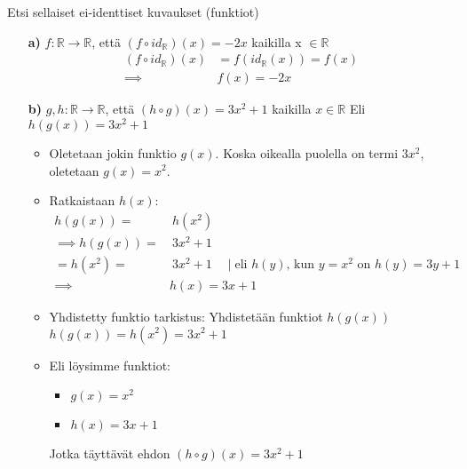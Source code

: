 \documentclass{article}
\begin{document}
    Etsi sellaiset ei-identtiset kuvaukset (funktiot)
    \begin{itemize}
        \item[\textbf{a)}] $f : \mathbb{R} \rightarrow \mathbb{R}$, että $(f \circ id_\mathbb{R})(x) = -2x$ kaikilla x $\in \mathbb{R}$
        \[
            \begin{aligned}
                (f \circ id_{\mathbb{R}})(x) &= f(id_{\mathbb{R}}(x)) = f(x) \\
                \implies & f(x) = -2x
            \end{aligned}
        \]

        \item[\textbf{b)}] $g, h: \mathbb{R} \rightarrow \mathbb{R}$, että $(h \circ g)(x) = 3x^2 + 1$ kaikilla $x \in \mathbb{R}$\newline
        Eli $h(g(x)) = 3x^2 + 1$
        \begin{itemize}
            \item Oletetaan jokin funktio $g(x)$. Koska oikealla puolella on termi $3x^2$, oletetaan $g(x) = x^2$.
            \item Ratkaistaan $h(x)$:
            \[
                \begin{aligned}
                    h(g(x)) = & \  h(x^2)\\
                    \implies h(g(x)) = & \ 3x^2 + 1\\
                    = h(x^2) = & \ 3x^2 + 1 \quad \mid \text{eli $h(y)$, kun $y = x^2$ on $h(y) = 3y + 1$} \\
                    \implies & h(x) = 3x + 1                                        
                \end{aligned}
            \]
            \item Yhdistetty funktio tarkistus:\newline
            Yhdistetään funktiot $h(g(x))$\newline
            $h(g(x)) = h(x^2) = 3x^2 + 1$
            \item Eli löysimme funktiot:
            \begin{itemize}
                \item $g(x) = x^2$
                \item $h(x) = 3x + 1$
            \end{itemize}
            Jotka täyttävät ehdon $(h \circ g)(x) = 3x^2 + 1$

            
        \end{itemize}




\end{itemize}
\end{document}
